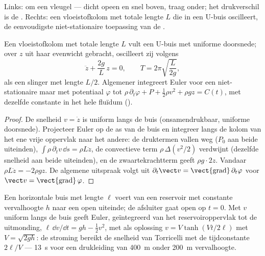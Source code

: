 \begin{omfigure}
{\small Links:  om een vleugel --- dicht opeen en snel boven,
traag onder; het drukverschil is de . Rechts: een vloeistofkolom
met totale lengte $L$ die in een U-buis oscilleert, de eenvoudigste
niet-stationaire toepassing van de .}
\end{omfigure}

\begin{proposition}\label{prop:b2:euler-bernoulli:utube}
Een vloeistofkolom met totale lengte $L$ vult een U-buis met uniforme
doorsnede; over $z$ uit haar evenwicht gebracht, oscilleert zij volgens
\[
\ddot z + \frac{2g}{L}\,z = 0 , \qquad T = 2\pi\sqrt{\frac{L}{2g}} ,
\]
als een slinger met lengte $L/2$. Algemener integreert Euler voor een
niet-stationaire maar  met potentiaal $\varphi$ tot
$\rho\,\partial_t\varphi + P + \tfrac12\rho v^2 + \rho gz = C(t)$, met
dezelfde constante in het hele fluïdum ().
\end{proposition}

\begin{proof}
De snelheid $v = \dot z$ is uniform langs de buis (onsamendrukbaar, uniforme
doorsnede). Projecteer Euler op de as van de buis en integreer langs de
kolom van het ene vrije oppervlak naar het andere: de druktermen vallen weg
($P_0$ aan beide uiteinden), $\int\rho\,\partial_tv\,\dd s = \rho L\ddot z$,
de convectieve term $\rho\,\Delta(v^2/2)$ verdwijnt (dezelfde snelheid aan
beide uiteinden), en de zwaartekrachtterm geeft $\rho g\cdot2z$. Vandaar
$\rho L\ddot z = -2\rho gz$. De algemene uitspraak volgt uit
$\partial_t\vect v = \operatorname{\vect{grad}}
\partial_t\varphi$ voor
$\vect v = \operatorname{\vect{grad}}\varphi$.
\end{proof}

\begin{example}\label{ex:b2:euler-bernoulli:start}
Een horizontale buis met lengte $\ell$ voert van een reservoir met constante
vervalhoogte $h$ naar een open uiteinde; de afsluiter gaat open op $t = 0$.
Met $v$ uniform langs de buis geeft Euler, geïntegreerd van het
reservoiroppervlak tot de uitmonding,
$\ell\,\dd v/\dd t = gh - \tfrac12v^2$, met als oplossing
$v = V\tanh(Vt/2\ell)$ met $V = \sqrt{2gh}$: de stroming bereikt de snelheid
van Torricelli met de tijdconstante $2\ell/V$ --- \qty{13}{s} voor een
drukleiding van \qty{400}{m} onder \qty{200}{m} vervalhoogte.
\end{example}

